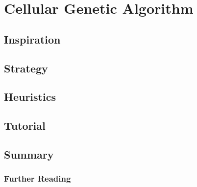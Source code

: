 \section{Cellular Genetic Algorithm}

\subsection{Inspiration}


\subsection{Strategy}


\subsection{Heuristics}


\subsection{Tutorial}


\subsection{Summary}


\subsubsection{Further Reading}